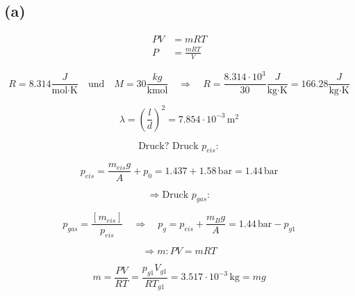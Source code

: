 

\subsection*{(a)}

\begin{align*}
PV &= mRT \\
P &= \frac{mRT}{V}
\end{align*}

\[
R = 8.314 \frac{J}{\text{mol} \cdot \text{K}} \quad \text{und} \quad M = 30 \frac{kg}{\text{kmol}} \quad \Rightarrow \quad R = \frac{8.314 \cdot 10^3}{30} \frac{J}{\text{kg} \cdot \text{K}} = 166.28 \frac{J}{\text{kg} \cdot \text{K}}
\]

\[
\lambda = \left( \frac{l}{d} \right)^2 = 7.854 \cdot 10^{-3} \, \text{m}^2
\]

\[
\text{Druck? Druck } p_{eis}:
\]

\[
p_{eis} = \frac{m_{eis} g}{A} + p_0 = 1.437 + 1.58 \, \text{bar} = 1.44 \, \text{bar}
\]

\[
\Rightarrow \text{Druck } p_{gas}:
\]

\[
p_{gas} = \frac{[m_{eis}]}{p_{eis}} \quad \Rightarrow \quad p_g = p_{eis} + \frac{m_B g}{A} = 1.44 \, \text{bar} - p_{g1}
\]

\[
\Rightarrow m: PV = mRT
\]

\[
m = \frac{PV}{RT} = \frac{p_{g1} V_{g1}}{R T_{g1}} = 3.517 \cdot 10^{-3} \, \text{kg} = mg
\]